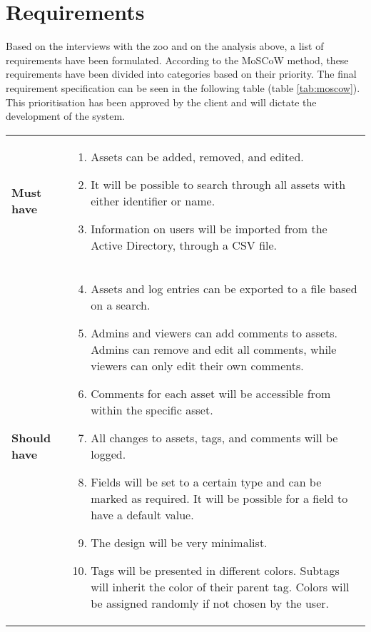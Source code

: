 \section{Requirements}\label{sc:requirements}
Based on the interviews with the zoo and on the analysis above, a list of requirements have been formulated. According to the MoSCoW method, these requirements have been divided into categories based on their priority. The final requirement specification can be seen in the following table (table \ref{tab:moscow}). This prioritisation has been approved by the client and will dictate the development of the system. 

\begin{longtable}{p{3.2cm} p{10cm}}
    \renewcommand{\arraystretch}{2.0}
        \\
        \hline
        \textbf{Must have} & 
        \vspace*{-7mm}
        \begin{enumerate} \itemsep0em 
            \item Assets can be added, removed, and edited.
            \item It will be possible to search through all assets with either identifier or name.
            \item Information on users will be imported from the Active Directory, through a CSV file.
        \end{enumerate}
        \\
        \hline
        
        \textbf{Should have} & 
        \vspace*{-7mm}
        \begin{enumerate} \setcounter{enumi}{3} \itemsep0em 
            \item Assets and log entries can be exported to a file based on a search.
            \item Admins and viewers can add comments to assets. Admins can remove and edit all comments, while viewers can only edit their own comments.
            \item Comments for each asset will be accessible from within the specific asset.
            \item All changes to assets, tags, and comments will be logged.
            \item Fields will be set to a certain type and can be marked as required. It will be possible for a field to have a default value.
            \item The design will be very minimalist.
            \item Tags will be presented in different colors. Subtags will inherit the color of their parent tag. Colors will be assigned randomly if not chosen by the user.
        \end{enumerate}
        \\
        \hline
        

\end{longtable}
